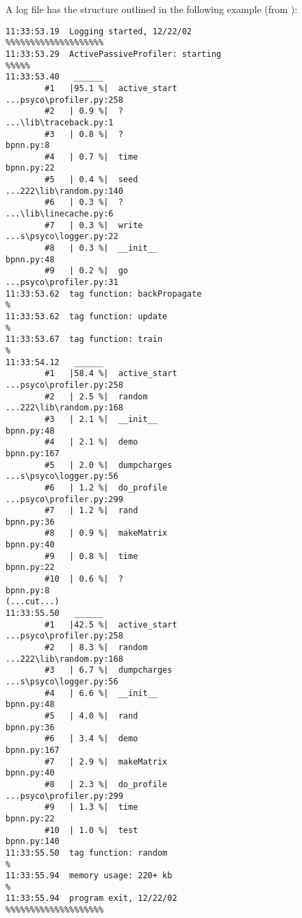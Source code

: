\documentclass{manual}
\begin{document}
A log file has the structure outlined in the following example (from ):

\begin{verbatim}
11:33:53.19  Logging started, 12/22/02                  %%%%%%%%%%%%%%%%%%%%
11:33:53.29  ActivePassiveProfiler: starting                           %%%%%
11:33:53.40   ______
        #1   |95.1 %|  active_start              ...psyco\profiler.py:258
        #2   | 0.9 %|  ?                         ...\lib\traceback.py:1
        #3   | 0.8 %|  ?                                      bpnn.py:8
        #4   | 0.7 %|  time                                   bpnn.py:22
        #5   | 0.4 %|  seed                      ...222\lib\random.py:140
        #6   | 0.3 %|  ?                         ...\lib\linecache.py:6
        #7   | 0.3 %|  write                     ...s\psyco\logger.py:22
        #8   | 0.3 %|  __init__                               bpnn.py:48
        #9   | 0.2 %|  go                        ...psyco\profiler.py:31
11:33:53.62  tag function: backPropagate                                   %
11:33:53.62  tag function: update                                          %
11:33:53.67  tag function: train                                           %
11:33:54.12   ______
        #1   |58.4 %|  active_start              ...psyco\profiler.py:258
        #2   | 2.5 %|  random                    ...222\lib\random.py:168
        #3   | 2.1 %|  __init__                               bpnn.py:48
        #4   | 2.1 %|  demo                                   bpnn.py:167
        #5   | 2.0 %|  dumpcharges               ...s\psyco\logger.py:56
        #6   | 1.2 %|  do_profile                ...psyco\profiler.py:299
        #7   | 1.2 %|  rand                                   bpnn.py:36
        #8   | 0.9 %|  makeMatrix                             bpnn.py:40
        #9   | 0.8 %|  time                                   bpnn.py:22
        #10  | 0.6 %|  ?                                      bpnn.py:8
(...cut...)
11:33:55.50   ______
        #1   |42.5 %|  active_start              ...psyco\profiler.py:258
        #2   | 8.3 %|  random                    ...222\lib\random.py:168
        #3   | 6.7 %|  dumpcharges               ...s\psyco\logger.py:56
        #4   | 6.6 %|  __init__                               bpnn.py:48
        #5   | 4.0 %|  rand                                   bpnn.py:36
        #6   | 3.4 %|  demo                                   bpnn.py:167
        #7   | 2.9 %|  makeMatrix                             bpnn.py:40
        #8   | 2.3 %|  do_profile                ...psyco\profiler.py:299
        #9   | 1.3 %|  time                                   bpnn.py:22
        #10  | 1.0 %|  test                                   bpnn.py:140
11:33:55.50  tag function: random                                          %
11:33:55.94  memory usage: 220+ kb                                         %
11:33:55.94  program exit, 12/22/02                     %%%%%%%%%%%%%%%%%%%%
\end{verbatim}
\end{document}
